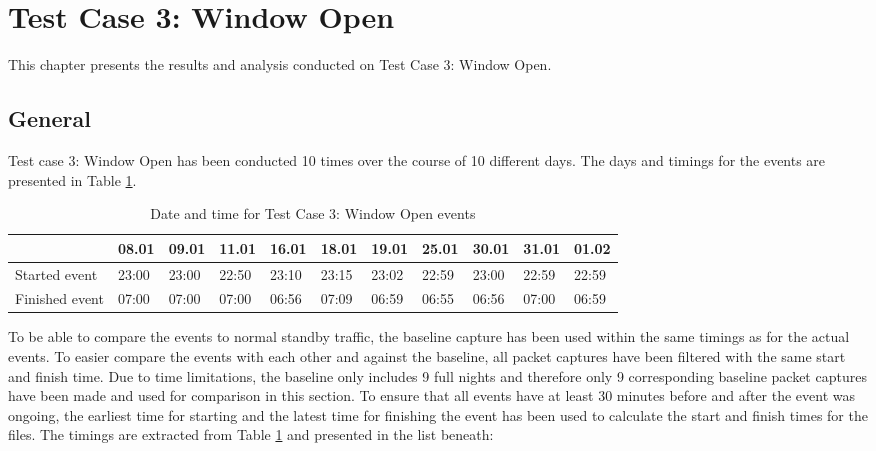 \newpage
\section{Test Case 3: Window Open}
This chapter presents the results and analysis conducted on Test Case 3: Window Open. 
\subsection{General}
Test case 3: Window Open has been conducted 10 times over the course of 10 different days. The days and timings for the events are presented in Table \ref{tab:WindowDates}.

\begin{table}[H]
    \centering
    \caption{Date and time for Test Case 3: Window Open events}
    \begin{adjustbox}{width=1\textwidth} 
            \begin{tabular}{l|l|l|l|l|l|l|l|l|l|l|}
                \cline{2-11}
                & 08.01 & 09.01 & 11.01 & 16.01 & 18.01 & 19.01 & 25.01 & 30.01 & 31.01 & 01.02 \\ \hline
                \multicolumn{1}{|l|}{Started event}  & 23:00 & 23:00 & 22:50 & 23:10 & 23:15 & 23:02 & 22:59 & 23:00 & 22:59 & 22:59 \\ \hline
                \multicolumn{1}{|l|}{Finished event} & 07:00 & 07:00 & 07:00 & 06:56 & 07:09 & 06:59 & 06:55 & 06:56 & 07:00 & 06:59 \\ \hline
            \end{tabular}
    \end{adjustbox}
    \label{tab:WindowDates}
\end{table}

To be able to compare the events to normal standby traffic, the baseline capture has been used within the same timings as for the actual events. To easier compare the events with each other and against the baseline, all packet captures have been filtered with the same start and finish time. Due to time limitations, the baseline only includes 9 full nights and therefore only 9 corresponding baseline packet captures have been made and used for comparison in this section. To ensure that all events have at least 30 minutes before and after the event was ongoing, the earliest time for starting and the latest time for finishing the event has been used to calculate the start and finish times for the files. The timings are extracted from Table \ref{tab:WindowDates} and presented in the list beneath: 


